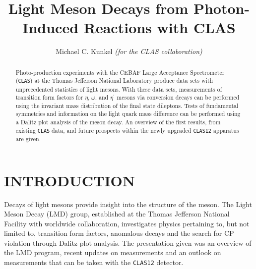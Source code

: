 \documentclass{aip-cp}
\begin{document}
\title{Light Meson Decays from Photon-Induced Reactions with CLAS}

\author[aff1]{Michael C. Kunkel {\it (for the CLAS collaboration) }}

\maketitle

\begin{abstract}
Photo-production experiments with the CEBAF Large Acceptance Spectrometer (\textsc{\texttt{CLAS}}) at the Thomas Jefferson National Laboratory produce data sets with unprecedented statistics of light mesons. With these data sets, measurements of transition form factors for $\eta$, $\omega$, and $\eta^\prime$ mesons via conversion decays can be performed using the invariant mass distribution of the final state dileptons. Tests of fundamental symmetries and information on the light quark mass difference can be performed using a Dalitz plot analysis of the meson decay. An overview of the first results, from existing \textsc{\texttt{CLAS}} data, and future prospects within the newly upgraded \textsc{\texttt{CLAS12}} apparatus are given.
\end{abstract}

\section{INTRODUCTION}
Decays of light mesons provide insight into the structure of the meson. The Light Meson Decay (LMD) group, established at the Thomas Jefferson National Facility with worldwide collaboration, investigates physics pertaining to, but not limited to, transition form factors, anomalous decays and the search for CP violation through Dalitz plot analysis. The presentation given was an overview of the LMD program, recent updates on measurements and an outlook on measurements that can be taken with the \textsc{\texttt{CLAS12}} detector. 
\end{document}
